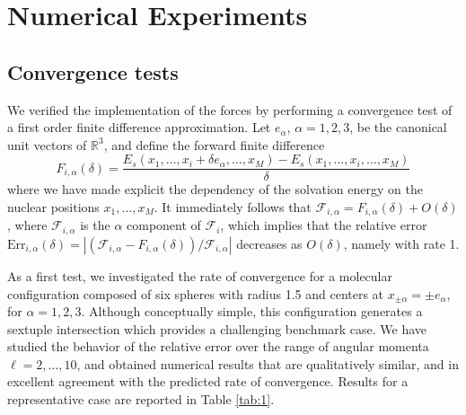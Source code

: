 \section{Numerical Experiments}\label{sec:experiments}
\subsection{Convergence tests}
We verified the implementation of the forces by performing a convergence test of a first order finite difference approximation. Let $e_\alpha$, $\alpha=1,2,3$, be the canonical unit vectors of $\mathbb R^3$, and define the forward finite difference
\[
	F_{i,\alpha}(\delta)
	= 
	\frac{E_s(x_1,\ldots,x_i + \delta e_\alpha,\ldots,x_M) - E_s(x_1,\ldots,x_i,\ldots,x_M)}{\delta}
\]
where we have made explicit the dependency of the solvation energy on the nuclear positions $x_1 , \ldots , x_M$. It immediately follows that $\mathcal{F}_{i,\alpha} = F_{i,\alpha}(\delta) + O(\delta)$, where $\mathcal{F}_{i,\alpha}$ is the $\alpha$ component of $\mathcal{F}_i$, which implies that the relative error $\text{Err}_{i,\alpha}(\delta) = |(\mathcal{F}_{i,\alpha} - F_{i,\alpha}(\delta))/\mathcal{F}_{i,\alpha}|$ decreases as $O(\delta)$, namely with rate 1.

As a first test, we investigated the rate of convergence for a molecular configuration composed of six spheres with radius 1.5 and centers at $x_{\pm \alpha} = \pm e_\alpha$, for $\alpha = 1, 2,3$. Although conceptually simple, this configuration generates a sextuple intersection which provides a challenging benchmark case. We have studied the behavior of the relative error over the range of angular momenta $\ell = 2, \ldots , 10$, and obtained numerical results that are qualitatively similar, and in excellent agreement with the predicted rate of convergence. Results for a representative case are reported in Table \ref{tab:1}.


